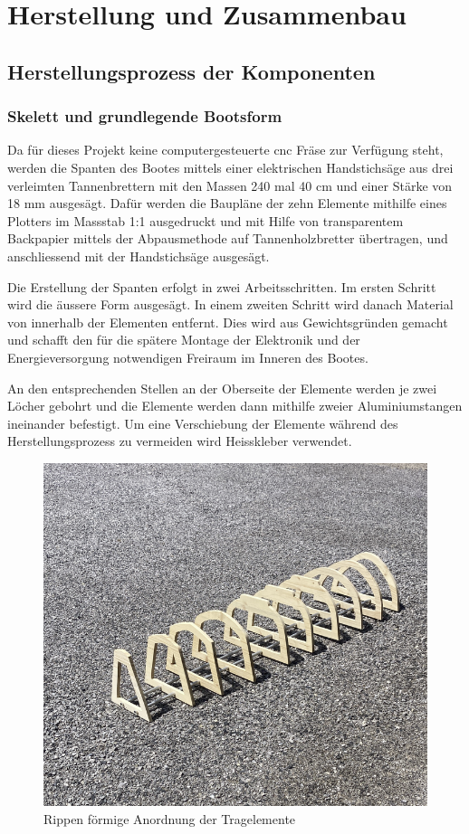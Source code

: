 

\chapter{Herstellung und Zusammenbau}
\label{chap:herstllung}

\section{Herstellungsprozess der Komponenten}
\subsection{Skelett und grundlegende Bootsform}
Da für dieses Projekt keine computergesteuerte \ac{cnc} Fräse zur Verfügung steht, werden die Spanten des Bootes mittels einer elektrischen Handstichsäge aus drei verleimten Tannenbrettern mit den Massen 240 mal 40 cm und einer Stärke von 18 mm ausgesägt. Dafür werden die Baupläne der zehn Elemente mithilfe eines Plotters im Massstab 1:1 ausgedruckt und  mit Hilfe von transparentem Backpapier mittels der Abpausmethode auf Tannenholzbretter übertragen, und anschliessend mit der Handstichsäge ausgesägt.

Die Erstellung der Spanten erfolgt in zwei Arbeitsschritten. Im ersten Schritt wird die äussere Form ausgesägt. In einem zweiten Schritt wird danach Material von innerhalb der Elementen entfernt. Dies wird aus Gewichtsgründen gemacht und schafft den für die spätere Montage der Elektronik und der Energieversorgung notwendigen Freiraum im Inneren des Bootes.

An den entsprechenden Stellen an der Oberseite der Elemente werden je zwei Löcher gebohrt und die Elemente werden dann mithilfe zweier Aluminiumstangen ineinander befestigt. Um eine Verschiebung der Elemente während des Herstellungsprozess zu vermeiden wird Heisskleber verwendet. 
\begin{figure}[H]
    \centering
    \includegraphics[width=1\linewidth]{rippe1.png}
    \caption{Rippen förmige Anordnung der Tragelemente}
    \label{fig:enter-label}
\end{figure}

